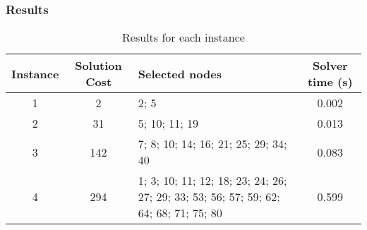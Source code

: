 \subsubsection*{Results}

\begin{table}[h!]
	\centering
	\begin{tabularx}{\textwidth}{|c|c|X|c|}
		\hline
		\textbf{Instance} & \textbf{Solution Cost} & \textbf{Selected nodes} & \textbf{Solver time (s)} \\
		\hline
		1 & 2 & 2; 5 & 0.002 \\
		\hline
		2 & 31 & 5; 10; 11; 19 & 0.013 \\
		\hline
		3 & 142 & 7; 8; 10; 14; 16; 21; 25; 29; 34; 40 & 0.083 \\
		\hline
		4 & 294 & 1; 3; 10; 11; 12; 18; 23; 24; 26; 27; 29; 33; 53; 56; 57; 59; 62; 64; 68; 71; 75; 80 & 0.599 \\
		\hline
	\end{tabularx}
	\caption{Results for each instance}
	\label{tab:instance_costs}
\end{table}
